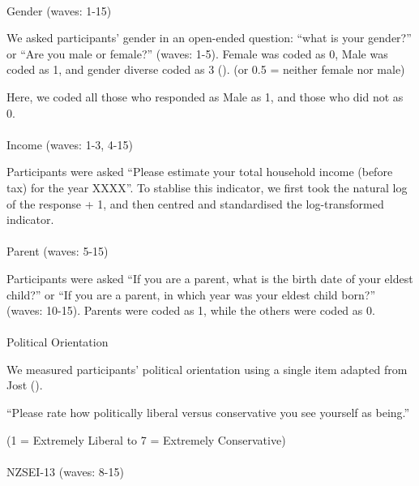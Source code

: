 \documentclass[
  single column]{article}
\makeatletter
\let\oldparagraph\paragraph
\renewcommand{\paragraph}{
    \@ifstar
      \xxxParagraphStar
      \xxxParagraphNoStar
  }
\newcommand{\xxxParagraphStar}[1]{\oldparagraph*{#1}\mbox{}}
\newcommand{\xxxParagraphNoStar}[1]{\oldparagraph{#1}\mbox{}}
\makeatother
\begin{document}
\paragraph{Gender (waves: 1-15)}\label{gender-waves-1-15}

We asked participants' gender in an open-ended question: ``what is your
gender?'' or ``Are you male or female?'' (waves: 1-5). Female was coded
as 0, Male was coded as 1, and gender diverse coded as 3
(). (or 0.5
= neither female nor male)

Here, we coded all those who responded as Male as 1, and those who did
not as 0.

\paragraph{Income (waves: 1-3, 4-15)}\label{income-waves-1-3-4-15}

Participants were asked ``Please estimate your total household income
(before tax) for the year XXXX''. To stablise this indicator, we first
took the natural log of the response + 1, and then centred and
standardised the log-transformed indicator.

\paragraph{Parent (waves: 5-15)}\label{parent-waves-5-15}

Participants were asked ``If you are a parent, what is the birth date of
your eldest child?'' or ``If you are a parent, in which year was your
eldest child born?'' (waves: 10-15). Parents were coded as 1, while the
others were coded as 0.

\paragraph{Political Orientation}\label{political-orientation}

We measured participants' political orientation using a single item
adapted from Jost ().

``Please rate how politically liberal versus conservative you see
yourself as being.''

(1 = Extremely Liberal to 7 = Extremely Conservative)

\paragraph{NZSEI-13 (waves: 8-15)}\label{nzsei-13-waves-8-15}
\end{document}
